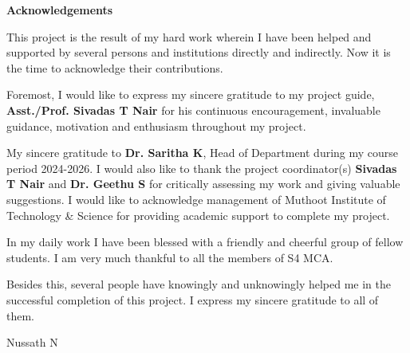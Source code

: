 \documentclass[11pt]{report}
\begin{document}
\begin{titlepage}
\begin{center}
\Large{\textbf{Acknowledgements}}\\[1cm]
\end{center}
\normalsize 
This project is the result of my hard work wherein I have been helped and supported by several persons and institutions directly and indirectly. Now it is the time to acknowledge their contributions.\par
Foremost, I would like to express my sincere gratitude to my project guide, \textbf{Asst./Prof. Sivadas T Nair} for his continuous encouragement, invaluable guidance, motivation and enthusiasm throughout my project. \par
My sincere gratitude to \textbf{Dr. Saritha K}, Head of Department during my course period 2024-2026. I would also like to thank the project coordinator(s) \textbf{Sivadas T Nair} and \textbf{Dr. Geethu S} for critically assessing my work and giving valuable suggestions. I would like to acknowledge management of Muthoot Institute of Technology \& Science for providing academic support to complete my project.\par
In my daily work I have been blessed with a friendly and cheerful group of fellow students. I am very much thankful to all the members of S4 MCA.\par
Besides this, several people have knowingly and unknowingly helped me in the successful completion of this project. I express my sincere gratitude to all of them.

\begin{flushright}
Nussath N
\end{flushright}
\end{titlepage}
\end{document}
